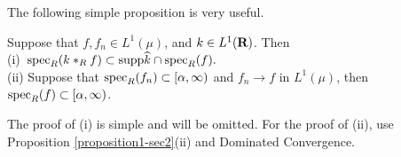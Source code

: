 The following
simple proposition is very useful.
\begin{prop-spectrum}
Suppose that $f, f_n\in L^1(\mu)$, and $k\in L^1(\R)$.
Then\\
(i)\  ${\rm spec}_R ( k*_R f)\subset {\rm supp}\widehat{k}\cap {\rm spec}_R(f).$\\
(ii) Suppose that 
 ${\rm spec}_R(f_n)\subset [\alpha,\infty)$ and $f_n\rightarrow f$ in $L^1(\mu)$, then
${\rm spec}_R(f)\subset [\alpha,\infty)$.
\label{prop-spectrum}
\end{prop-spectrum}
The proof of (i) is simple and will be 
omitted.  For the proof of (ii), use Proposition 
\ref{proposition1-sec2}(ii) and 
Dominated Convergence.


